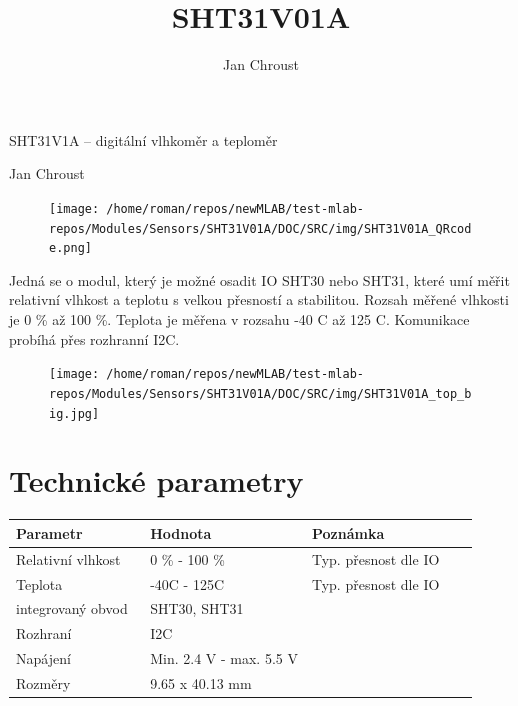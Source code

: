 \documentclass[12pt,a4paper]{article}
\author{ Jan Chroust }
\title{ SHT31V01A }
\begin{document}
\fontsize{14.4}{20}\selectfont

\vspace*{\fill}

\begin{center}
{\Huge SHT31V1A – digitální vlhkoměr a teploměr}

{\Large Jan Chroust}

\vspace*{\fill}
\vspace*{1cm}

\end{center}

\begin{figure}
    \texttt{[image: /home/roman/repos/newMLAB/test-mlab-repos/Modules/Sensors/SHT31V01A/DOC/SRC/img/SHT31V01A\_QRcode.png]}
\end{figure}

Jedná se o modul, který je možné osadit IO SHT30 nebo SHT31, které umí
měřit relativní vlhkost a teplotu s velkou přesností a stabilitou.
Rozsah měřené vlhkosti je 0 \% až 100 \%. Teplota je měřena v rozsahu
-40 C až 125 C. Komunikace probíhá přes rozhranní I2C.


\vspace*{\fill}
\vfill
\vspace*{1cm}

\begin{figure}[ht!]
\centering
\texttt{[image: /home/roman/repos/newMLAB/test-mlab-repos/Modules/Sensors/SHT31V01A/DOC/SRC/img/SHT31V01A\_top\_big.jpg]} 
\end{figure}


\section{Technické parametry}\label{technickuxe9-parametry}

\begin{longtable}[c]{@{}lll@{}}
\toprule
Parametr ~ ~ ~ ~ & Hodnota ~ ~ ~ & Poznámka ~ ~ ~ ~ ~ ~\tabularnewline
\midrule
\endhead
Relativní vlhkost & 0 \% - 100 \% ~ & Typ. přesnost dle
IO\tabularnewline
Teplota ~ ~ ~ ~ ~ & -40C - 125C ~ & Typ. přesnost dle IO\tabularnewline
integrovaný obvod & SHT30, SHT31 & ~ ~ ~ ~ ~ ~ ~ ~ ~ ~\tabularnewline
Rozhraní & I2C &\tabularnewline
Napájení & Min. 2.4 V - max. 5.5 V &\tabularnewline
Rozměry & 9.65 x 40.13 mm &\tabularnewline
\bottomrule
\end{longtable}
\end{document}
